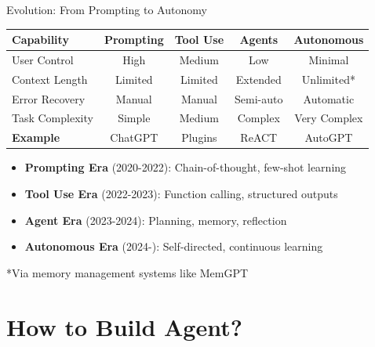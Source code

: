 \documentclass[aspectratio=169]{beamer}
\begin{document}
\begin{frame}{Evolution: From Prompting to Autonomy}
	\begin{center}
		\begin{tabular}{|l|c|c|c|c|}
			\hline
			\textbf{Capability} & \textbf{Prompting} & \textbf{Tool Use} & \textbf{Agents} & \textbf{Autonomous} \\
			\hline
			User Control & High & Medium & Low & Minimal \\
			Context Length & Limited & Limited & Extended & Unlimited* \\
			Error Recovery & Manual & Manual & Semi-auto & Automatic \\
			Task Complexity & Simple & Medium & Complex & Very Complex \\
			\hline
			\textbf{Example} & ChatGPT & Plugins & ReACT & AutoGPT \\
			\hline
		\end{tabular}
	\end{center}
	
	\vspace{0.5cm}
	
	\begin{itemize}
		\item {\color{highlight}\textbf{Prompting Era}} (2020-2022): Chain-of-thought, few-shot learning
		\item {\color{highlight}\textbf{Tool Use Era}} (2022-2023): Function calling, structured outputs
		\item {\color{highlight}\textbf{Agent Era}} (2023-2024): Planning, memory, reflection
		\item {\color{highlight}\textbf{Autonomous Era}} (2024-): Self-directed, continuous learning
	\end{itemize}
	
	\small
	*Via memory management systems like MemGPT
\end{frame}

\section{How to Build Agent?}
\end{document}

